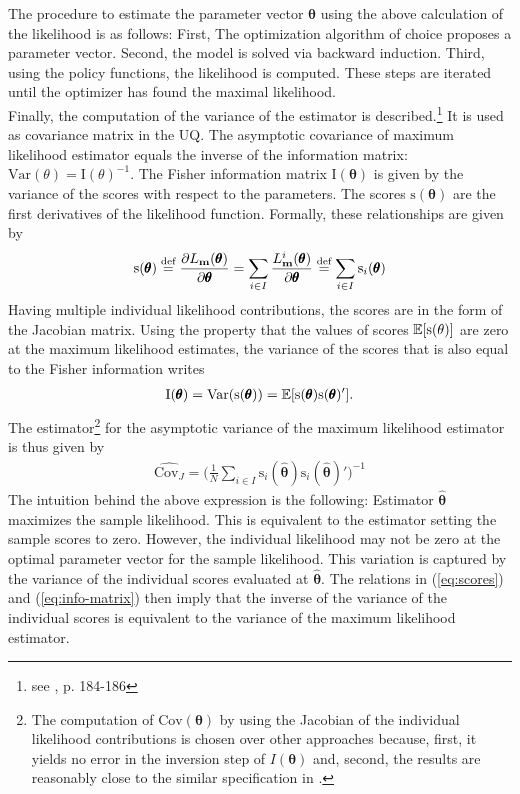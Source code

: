 The procedure to estimate the parameter vector $\pmb{\theta}$ using the above calculation of the likelihood is as follows: First, The optimization algorithm of choice proposes a parameter vector. Second, the model is solved via backward induction. Third, using the policy functions, the likelihood is computed. These steps are iterated until the optimizer has found the maximal likelihood. 
\\

Finally, the computation of the variance of the estimator is described.\footnote{see \cite{Verbeek.2012}, p. 184-186} It is used as covariance matrix in the UQ. The asymptotic covariance of maximum likelihood estimator equals the inverse of the information matrix: $\text{Var}(\theta)=\text{I}(\theta)^{-1}$. The Fisher information matrix $\text{I}(\pmb{\theta})$ is given by the variance of the scores with respect to the parameters. The scores $\text{s}(\pmb{\theta})$ are the first derivatives of the likelihood function. Formally, these relationships are given by
\begin{align} \label{eq:scores}
\text{s}(\pmb{\theta}) \stackrel{\text{def}}{=} \frac{\partial L_{\bold{m}}({\pmb{\theta}})} {\partial \pmb{\theta}} = \sum_{i \in I} \frac{L_{\bold{m}}^{i}(\pmb{\theta})}{\partial \pmb{\theta}} \stackrel{\text{def}}{=} \sum_{i \in I}\text{s}_i(\pmb{\theta})
\end{align}
Having multiple individual likelihood contributions, the scores are in the form of the  Jacobian matrix.
Using the property that the values of scores $\operatorname*{\mathbb{E}}[\text{s}(\theta)]$ are zero at the maximum likelihood estimates, the variance of the scores that is also equal to the Fisher information writes
\begin{align} \label{eq:info-matrix}
\text{I}(\pmb{\theta}) = \text{Var}(\text{s}(\pmb{\theta})) = \operatorname*{\mathbb{E}}[\text{s}(\pmb{\theta})\text{s}(\pmb{\theta})'].
\end{align}
The estimator\footnote{The computation of $\text{Cov}(\pmb{\theta})$ by using the Jacobian of the individual likelihood contributions is chosen over other approaches because, first, it yields no error in the inversion step of $I(\pmb{\theta})$ and, second, the results are reasonably close to the similar specification in \cite{Keane.1994}.} for the asymptotic variance of the maximum likelihood estimator is thus given by
\begin{align} \label{eq:est-cov}
\hat{\text{Cov}_J} = \bigg( \frac{1}{N} \sum_{i \in I} \text{s}_i(\pmb{\hat{\theta}})\text{s}_i(\pmb{\hat{\theta}})' \bigg)^{-1}
\end{align}
The intuition behind the above expression is the following: Estimator $\pmb{\hat{\theta}}$ maximizes the sample likelihood. This is equivalent to the estimator setting the sample scores to zero. However, the individual likelihood may not be zero at the optimal parameter vector for the sample likelihood. This variation is captured by the variance of the individual scores evaluated at $\pmb{\hat{\theta}}$. The relations in (\ref{eq:scores}) and (\ref{eq:info-matrix}) then imply that the inverse of the variance of the individual scores is equivalent to the variance of the maximum likelihood estimator.

